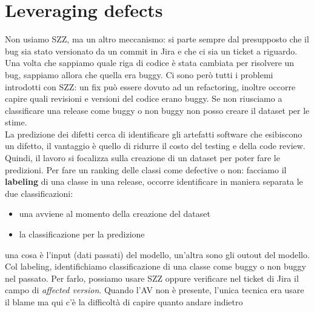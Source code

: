 \documentclass{article}
\begin{document}
\section{Leveraging defects}
Non usiamo SZZ, ma un altro meccanismo: si parte sempre dal presupposto che il bug sia stato versionato da un commit in Jira e che ci sia un ticket a riguardo. Una volta che sappiamo quale riga di codice è stata cambiata per risolvere un bug, sappiamo allora che quella era buggy. Ci sono però tutti i problemi introdotti con SZZ: un fix può essere dovuto ad un refactoring, inoltre occorre capire quali revisioni e versioni del codice erano buggy. Se non riusciamo a classificare una release come buggy o non buggy non posso creare il dataset per le stime.\\ La predizione dei difetti cerca di identificare gli artefatti software che esibiscono un difetto, il vantaggio è quello di ridurre il costo del testing e della code review.\\ Quindi, il lavoro si focalizza sulla creazione di un dataset per poter fare le predizioni. Per fare un ranking delle classi come defective o non: facciamo il \textbf{labeling} di una classe in una release, occorre identificare in maniera separata le due classificazioni:
\begin{itemize}
\item una avviene al momento della creazione del dataset
\item la classificazione per la predizione
\end{itemize}
una cosa è l'input (dati passati) del modello, un'altra sono gli outout del modello. Col labeling, identifichiamo classificazione di una classe come buggy o non buggy nel passato. Per farlo, possiamo usare SZZ oppure verificare nel ticket di Jira il campo di \textit{affected version}. Quando l'AV non è presente, l'unica tecnica era usare il blame ma qui c'è la difficoltà di capire quanto andare indietro
\end{document}
